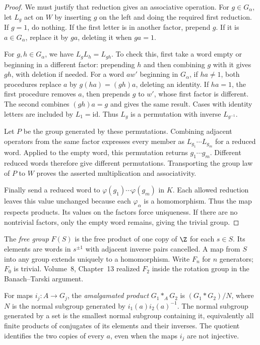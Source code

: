 \begin{proof}
We must justify that reduction gives an associative operation. For $g\in G_\alpha$, let $L_g$ act on $W$ by inserting $g$ on the left and doing the required first reduction. If $g=1$, do nothing. If the first letter is in another factor, prepend $g$. If it is $a\in G_\alpha$, replace it by $ga$, deleting it when $ga=1$.

For $g,h\in G_\alpha$, we have $L_gL_h=L_{gh}$. To check this, first take a word empty or beginning in a different factor: prepending $h$ and then combining $g$ with it gives $gh$, with deletion if needed. For a word $aw'$ beginning in $G_\alpha$, if $ha\ne1$, both procedures replace $a$ by $g(ha)=(gh)a$, deleting an identity. If $ha=1$, the first procedure removes $a$, then prepends $g$ to $w'$, whose first factor is different. The second combines $(gh)a=g$ and gives the same result. Cases with identity letters are included by $L_1=\mathrm{id}$. Thus $L_g$ is a permutation with inverse $L_{g^{-1}}$.

Let $P$ be the group generated by these permutations. Combining adjacent operators from the same factor expresses every member as $L_{g_1}\cdots L_{g_m}$ for a reduced word. Applied to the empty word, this permutation returns $g_1\cdots g_m$. Different reduced words therefore give different permutations. Transporting the group law of $P$ to $W$ proves the asserted multiplication and associativity.

Finally send a reduced word to $\varphi(g_1)\cdots\varphi(g_m)$ in $K$. Each allowed reduction leaves this value unchanged because each $\varphi_\alpha$ is a homomorphism. Thus the map respects products. Its values on the factors force uniqueness. If there are no nontrivial factors, only the empty word remains, giving the trivial group.
\end{proof}

The \emph{free group} $F(S)$ is the free product of one copy of $\Z$ for each $s\in S$. Its elements are words in $s^{\pm1}$ with adjacent inverse pairs cancelled. A map from $S$ into any group extends uniquely to a homomorphism. Write $F_n$ for $n$ generators; $F_0$ is trivial. Volume~8, Chapter~13 realized $F_2$ inside the rotation group in the Banach--Tarski argument.

For maps $i_j:A\to G_j$, the \emph{amalgamated product} $G_1\ast_A G_2$ is $(G_1\ast G_2)/N$, where $N$ is the normal subgroup generated by $i_1(a)i_2(a)^{-1}$. The normal subgroup generated by a set is the smallest normal subgroup containing it, equivalently all finite products of conjugates of its elements and their inverses. The quotient identifies the two copies of every $a$, even when the maps $i_j$ are not injective.

